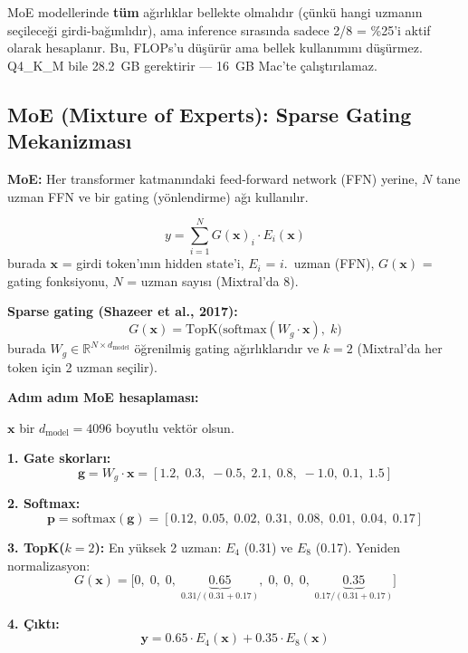 \begin{dikkat}
MoE modellerinde \textbf{t\"{u}m} a\u{g}{\i}rl{\i}klar bellekte olmal{\i}d{\i}r (\c{c}\"{u}nk\"{u} hangi uzman{\i}n se\c{c}ilece\u{g}i girdi-ba\u{g}{\i}ml{\i}d{\i}r), ama inference s{\i}ras{\i}nda sadece 2/8 = \%25'i aktif olarak hesaplan{\i}r. Bu, FLOPs'u d\"{u}\c{s}\"{u}r\"{u}r ama bellek kullan{\i}m{\i}n{\i} d\"{u}\c{s}\"{u}rmez. Q4\_K\_M bile 28.2~GB gerektirir --- 16~GB Mac'te \c{c}al{\i}\c{s}t{\i}r{\i}lamaz.
\end{dikkat}


\subsection{MoE (Mixture of Experts): Sparse Gating Mekanizmas{\i}}
\label{sec:moe}

\begin{tanim}
\textbf{MoE:} Her transformer katman{\i}ndaki feed-forward network (FFN) yerine, $N$ tane uzman FFN ve bir gating (y\"{o}nlendirme) a\u{g}{\i} kullan{\i}l{\i}r.
\end{tanim}

\begin{formulbox}
\begin{equation}
y = \sum_{i=1}^{N} G(\mathbf{x})_i \cdot E_i(\mathbf{x})
\label{eq:moe}
\end{equation}
burada $\mathbf{x}$ = girdi token'{\i}n{\i}n hidden state'i, $E_i$ = $i$.~uzman (FFN), $G(\mathbf{x})$ = gating fonksiyonu, $N$ = uzman say{\i}s{\i} (Mixtral'da 8).

\textbf{Sparse gating (Shazeer et al., 2017):}
\begin{equation}
G(\mathbf{x}) = \mathrm{TopK}\bigl(\mathrm{softmax}(W_g \cdot \mathbf{x}),\; k\bigr)
\label{eq:sparse-gating}
\end{equation}
burada $W_g \in \mathbb{R}^{N \times d_{\text{model}}}$ \"{o}\u{g}renilmi\c{s} gating a\u{g}{\i}rl{\i}klar{\i}d{\i}r ve $k = 2$ (Mixtral'da her token i\c{c}in 2 uzman se\c{c}ilir).
\end{formulbox}

\begin{ornek}
\textbf{Ad{\i}m ad{\i}m MoE hesaplamas{\i}:}

$\mathbf{x}$ bir $d_{\text{model}}{=}4096$ boyutlu vekt\"{o}r olsun.

\textbf{1. Gate skorlar{\i}:}
\[
\mathbf{g} = W_g \cdot \mathbf{x} = [1.2,\; 0.3,\; -0.5,\; 2.1,\; 0.8,\; -1.0,\; 0.1,\; 1.5]
\]

\textbf{2. Softmax:}
\[
\mathbf{p} = \mathrm{softmax}(\mathbf{g}) = [0.12,\; 0.05,\; 0.02,\; 0.31,\; 0.08,\; 0.01,\; 0.04,\; 0.17]
\]

\textbf{3. TopK($k{=}2$):} En y\"{u}ksek 2 uzman: $E_4$ (0.31) ve $E_8$ (0.17).
Yeniden normalizasyon:
\[
G(\mathbf{x}) = \bigl[0,\; 0,\; 0,\; \underbrace{0.65}_{0.31/(0.31{+}0.17)},\; 0,\; 0,\; 0,\; \underbrace{0.35}_{0.17/(0.31{+}0.17)}\bigr]
\]

\textbf{4. \c{C}{\i}kt{\i}:}
\[
\mathbf{y} = 0.65 \cdot E_4(\mathbf{x}) + 0.35 \cdot E_8(\mathbf{x})
\]
\end{ornek}

